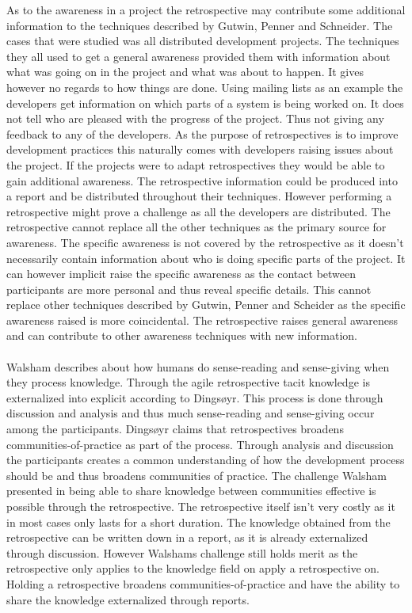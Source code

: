 \documentclass[12pt]{article}
\begin{document}
As to the awareness in a project the retrospective may contribute some additional information to the techniques described by Gutwin, Penner and Schneider. The cases that were studied was all distributed development projects. The techniques they all used to get a general awareness provided them with information about what was going on in the project and what was about to happen. It gives however no regards to how things are done. Using mailing lists as an example the developers get information on which parts of a system is being worked on. It does not tell who are pleased with the progress of the project. Thus not giving any feedback to any of the developers. As the purpose of retrospectives is to improve development practices this naturally comes with developers raising issues about the project. If the projects were to adapt retrospectives they would be able to gain additional awareness. The retrospective information could be produced into a report and be distributed throughout their techniques. However performing a retrospective might prove a challenge as all the developers are distributed. The retrospective cannot replace all the other techniques as the primary source for awareness. The specific awareness is not covered by the retrospective as it doesn't necessarily contain information about who is doing specific parts of the project. It can however implicit raise the specific awareness as the contact between participants are more personal and thus reveal specific details. This cannot replace other techniques described by Gutwin, Penner and Scheider as the specific awareness raised is more coincidental. The retrospective raises general awareness and can contribute to other awareness techniques with new information.
\\\\
Walsham describes about how humans do sense-reading and sense-giving when they process knowledge. Through the agile retrospective tacit knowledge is externalized into explicit according to Dingsøyr. This process is done through discussion and analysis and thus much sense-reading and sense-giving occur among the participants. Dingsøyr claims that retrospectives broadens communities-of-practice as part of the process. Through analysis and discussion the participants creates a common understanding of how the development process should be and thus broadens communities of practice. The challenge Walsham presented in being able to share knowledge between communities effective is possible through the retrospective. The retrospective itself isn't very costly as it in most cases only lasts for a short duration. The knowledge obtained from the retrospective can be written down in a report, as it is already externalized through discussion. However Walshams challenge still holds merit as the retrospective only applies to the knowledge field on apply a retrospective on. Holding a retrospective broadens communities-of-practice and have the ability to share the knowledge externalized through reports. 
\end{document}
